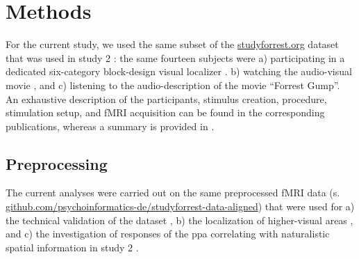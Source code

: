 \section{Methods}



For the current study, we used the same subset of the
\href{http://www.studyforrest.org}{studyforrest.org} dataset that was used in
study 2 \citep{haeusler2022processing}:
%
the same fourteen subjects were
a) participating in a dedicated six-category block-design visual localizer
\citep{sengupta2016extension}.
b) watching the audio-visual movie \citep{hanke2016simultaneous}, and
c) listening to the audio-description \citep{hanke2014audiomovie} of the movie
``Forrest Gump''.
An exhaustive description of the participants, stimulus creation, procedure,
stimulation setup, and fMRI acquisition can be found in the corresponding
publications, whereas a summary is provided in \citep{haeusler2022processing}.


\subsection{Preprocessing}

The current analyses were carried out on the same preprocessed fMRI data (s.
\href{https://github.com/psychoinformatics-de/studyforrest-data-aligned
}{github.com/psychoinformatics-de/studyforrest-data-aligned}) that were used for
%
a) the technical validation of the dataset \citep{hanke2016simultaneous},
%
b) the localization of higher-visual areas \citep{sengupta2016extension}, and
%
c) the investigation of responses of the \ac{ppa} correlating with naturalistic
spatial information in study 2 \citep{haeusler2022processing}.

